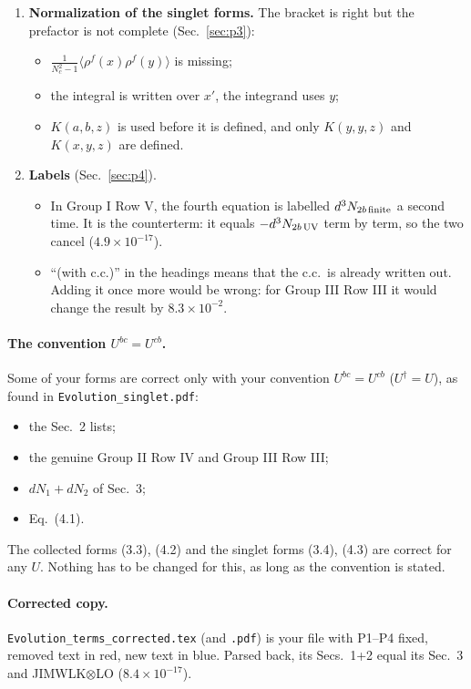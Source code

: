 \documentclass[10pt]{article}
\numberwithin{equation}{section}
\newcommand{\new}[1]{{\color{blue}#1}}
\newcommand{\old}[1]{{\color{red}#1}}
\begin{document}
\begin{enumerate}
\begin{itemize}
\end{itemize}
\item[\textbf{P3}] \textbf{Normalization of the singlet forms.} The bracket is right but the prefactor is not complete (Sec.~\ref{sec:p3}):
\begin{itemize}
\item $\frac{1}{N_c^2-1}\langle\rho^f(x)\rho^f(y)\rangle$ is missing;
\item the integral is written over $x'$, the integrand uses $y$;
\item $K(a,b,z)$ is used before it is defined, and only $K(y,y,z)$ and $K(x,y,z)$ are defined.
\end{itemize}
\item[\textbf{P4}] \textbf{Labels} (Sec.~\ref{sec:p4}).
\begin{itemize}
\item In Group I Row V, the fourth equation is labelled $d^3N_{2b\,\rm finite}$ a second time. It is the counterterm: it equals $-d^3N_{2b\,\rm UV}$ term by term, so the two cancel ($4.9\times10^{-17}$).
\item ``(with c.c.)'' in the headings means that the c.c.\ is already written out. Adding it once more would be wrong: for Group III Row III it would change the result by $8.3\times10^{-2}$.
\end{itemize}
\end{enumerate}

\paragraph{The convention $U^{bc}=U^{cb}$.} Some of your forms are correct only with your convention $U^{bc}=U^{cb}$ ($U^\dagger=U$), as found in \texttt{Evolution\_singlet.pdf}:
\begin{itemize}
\item the Sec.~2 lists;
\item the genuine Group II Row IV and Group III Row III;
\item $dN_1+dN_2$ of Sec.~3;
\item Eq.~(4.1).
\end{itemize}
The collected forms (3.3), (4.2) and the singlet forms (3.4), (4.3) are correct for any $U$. Nothing has to be changed for this, as long as the convention is stated.

\paragraph{Corrected copy.} \texttt{Evolution\_terms\_corrected.tex} (and \texttt{.pdf}) is your file with P1--P4 fixed, removed text in \old{red}, new text in \new{blue}. Parsed back, its Secs.~1+2 equal its Sec.~3 and JIMWLK$\otimes$LO ($8.4\times10^{-17}$).
\end{document}

